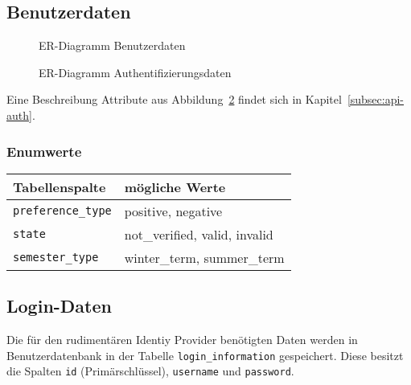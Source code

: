 \subsection{Benutzerdaten}
\begin{figure}[H]
	
	\caption{ER-Diagramm Benutzerdaten}
	\label{fig:user-er}
\end{figure}
\begin{figure}[H]
	
	\caption{ER-Diagramm Authentifizierungsdaten}
	\label{fig:auth-er}
\end{figure}

Eine Beschreibung Attribute aus Abbildung~\ref{fig:auth-er} findet sich in Kapitel~\ref{subsec:api-auth}.
\subsubsection{Enumwerte}
\begin{table}[h]
	\begin{tabular}{|l|l|}
		\hline
		\textbf{Tabellenspalte} & \textbf{mögliche Werte} \\ \hline
		\texttt{preference\_type} & positive, negative \\ \hline
		\texttt{state} & not\_verified, valid, invalid \\ \hline
		\texttt{semester\_type} & winter\_term, summer\_term \\ \hline
	\end{tabular}
\end{table}

\subsection{Login-Daten}
Die für den rudimentären Identiy Provider benötigten Daten werden in Benutzerdatenbank in der Tabelle \texttt{login\_information} gespeichert. Diese besitzt die Spalten \texttt{id} (Primärschlüssel), \texttt{username} und \texttt{password}.